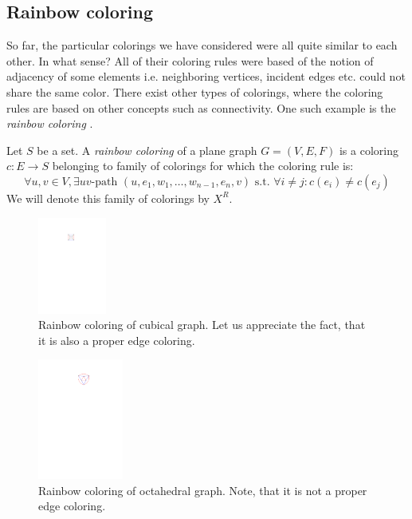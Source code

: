 \subsection{Rainbow coloring}

So far, the particular colorings we have considered were all quite similar to each other. In what sense? All of their coloring rules were based of the notion of adjacency of some elements i.e. neighboring vertices, incident edges etc. could not share the same color. There exist other types of colorings, where the coloring rules are based on other concepts such as connectivity. One such example is the \textit{rainbow coloring} \cite{chartrand08}.

\begin{defn}
    Let $S$ be a set. A \emph{rainbow coloring} of a plane graph $G=(V,E,F)$ is a coloring $c: E \rightarrow S$ belonging to family of colorings for which the coloring rule is: 
    \begin{equation}\label{eqn:rainbow_rule}
     \forall u,v \in V, \exists uv \text{-path } (u,e_1,w_1, \ldots ,w_{n-1},e_n,v) \text{ s.t. } \forall i \neq j : c(e_i) \neq c(e_j) \tag{$R_R$}
    \end{equation}
    We will denote this family of colorings by $X^R$.
\end{defn}

\begin{figure}[H]
    \centering
    \includegraphics[width=0.2\textwidth]{../Resources/Figs/cubical_edg_colr.pdf}
    \caption{Rainbow coloring of cubical graph. Let us appreciate the fact, that it is also a proper edge coloring.}
    \label{fig:cubical_rainbow_coloring}
\end{figure}

\begin{figure}[H]
    \centering
    \includegraphics[width=0.25\textwidth]{../Resources/Figs/octahedral_rainbow_colr.pdf}
    \caption{Rainbow coloring of octahedral graph. Note, that it is not a proper edge coloring.}
    \label{fig:octahedral_rainbow_coloring}
\end{figure}

